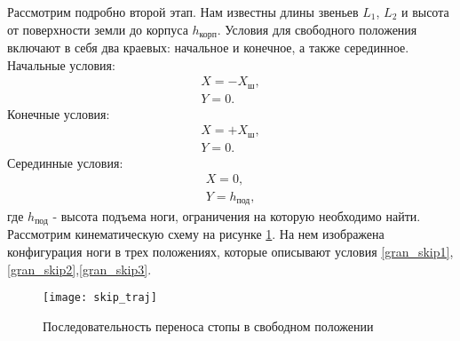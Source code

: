 Рассмотрим подробно второй этап. Нам известны длины звеньев $L_{1}$, $L_{2}$ и высота от поверхности земли до корпуса $h_{\text{корп}}$. 
Условия для свободного положения включают в себя два краевых: начальное и конечное, а также серединное.
\newline
Начальные условия:
\begin{equation}
	\begin{array}{l}
		X = -X_{\text{ш}},
		\\
		Y = 0.
	\label{gran_skip1}
	\end{array}
\end{equation}
Конечные условия:
\begin{equation}
	\begin{array}{l}
		X = +X_{\text{ш}},
		\\
		Y = 0.
	\label{gran_skip2}
	\end{array}
\end{equation}
Серединные условия:
\begin{equation}
	\begin{array}{l}
		X = 0,
		\\
		Y = h_{\text{под}},
	\end{array}
	\label{gran_skip3}
\end{equation}
где $h_{\text{под}}$ - высота подъема ноги, ограничения на которую необходимо найти.
Рассмотрим кинематическую схему на рисунке \ref{skip_traj}. На нем изображена конфигурация ноги в трех положениях, которые описывают условия \ref{gran_skip1},\ref{gran_skip2},\ref{gran_skip3}. 
\newline
\begin{figure}[h!]
	\begin{center}
		\texttt{[image: skip\_traj]}
		\caption{Последовательность переноса стопы в свободном положении}
		\label{skip_traj}
	\end{center}
\end{figure}


